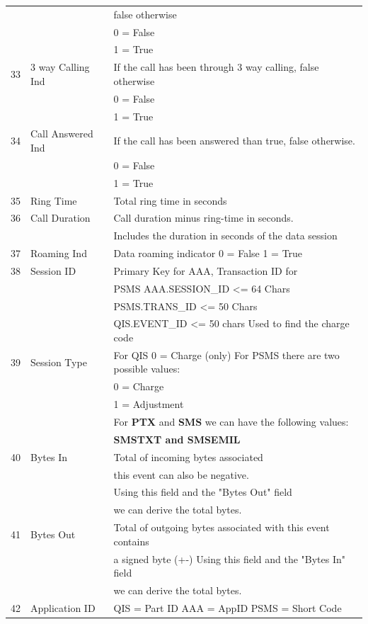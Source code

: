\documentclass[12pt,twoside]{article}
\begin{document}
\begin{longtable}{c|l|l}
 &  & false otherwise\\
 &  & 0 = False\\
 &  & 1 = True\\
33 & 3 way Calling Ind & If the call has been through 3 way calling, false otherwise\\
 &  & 0 = False\\
 &  & 1 = True\\
34 & Call Answered Ind & If the call has been answered than true, false otherwise.\\
 &  & 0 = False\\
 &  & 1 = True\\
35 & Ring Time & Total ring time in seconds\\
36 & Call Duration & Call duration minus ring-time in seconds.\\
 &  & Includes the duration in seconds of the data session\\
37 & Roaming Ind & Data roaming indicator 0 = False 1 = True\\
38 & Session ID & Primary Key for AAA, Transaction ID for\\
 &  & PSMS AAA.SESSION\_ID <= 64 Chars\\
 &  & PSMS.TRANS\_ID <= 50 Chars\\
 &  & QIS.EVENT\_ID <= 50 chars Used to find the charge code\\
39 & Session Type & For QIS 0 = Charge (only) For PSMS there are two possible values:\\
 &  & 0 = Charge\\
 &  & 1 = Adjustment\\
 &  & For \textbf{PTX} and \textbf{SMS} we can have the following values:\\
 &  & \textbf{SMSTXT and SMSEMIL}\\
40 & Bytes In & Total of incoming bytes associated\\
 &  & this event can also be negative.\\
 &  & Using this field and the "Bytes Out" field\\
 &  & we can derive the total bytes.\\
41 & Bytes Out & Total of outgoing bytes associated with this event contains\\
 &  & a signed byte (+-) Using this field and the "Bytes In" field\\
 &  & we can derive the total bytes.\\
42 & Application ID & QIS = Part ID AAA = AppID PSMS = Short Code\\

\end{longtable}
\end{document}
